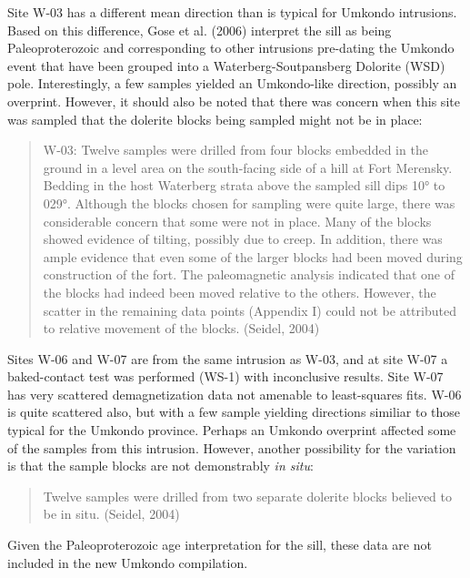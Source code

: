 \documentclass{article}
\begin{document}
    Site W-03 has a different mean direction than is typical for Umkondo
intrusions. Based on this difference, Gose et al. (2006) interpret the
sill as being Paleoproterozoic and corresponding to other intrusions
pre-dating the Umkondo event that have been grouped into a
Waterberg-Soutpansberg Dolorite (WSD) pole. Interestingly, a few samples
yielded an Umkondo-like direction, possibly an overprint. However, it
should also be noted that there was concern when this site was sampled
that the dolerite blocks being sampled might not be in place:

\begin{quote}
W-03: Twelve samples were drilled from four blocks embedded in the
ground in a level area on the south-facing side of a hill at Fort
Merensky. Bedding in the host Waterberg strata above the sampled sill
dips 10° to 029°. Although the blocks chosen for sampling were quite
large, there was considerable concern that some were not in place. Many
of the blocks showed evidence of tilting, possibly due to creep. In
addition, there was ample evidence that even some of the larger blocks
had been moved during construction of the fort. The paleomagnetic
analysis indicated that one of the blocks had indeed been moved relative
to the others. However, the scatter in the remaining data points
(Appendix I) could not be attributed to relative movement of the blocks.
(Seidel, 2004)
\end{quote}

Sites W-06 and W-07 are from the same intrusion as W-03, and at site
W-07 a baked-contact test was performed (WS-1) with inconclusive
results. Site W-07 has very scattered demagnetization data not amenable
to least-squares fits. W-06 is quite scattered also, but with a few
sample yielding directions similiar to those typical for the Umkondo
province. Perhaps an Umkondo overprint affected some of the samples from
this intrusion. However, another possibility for the variation is that
the sample blocks are not demonstrably \emph{in situ}:

\begin{quote}
Twelve samples were drilled from two separate dolerite blocks believed
to be in situ. (Seidel, 2004)
\end{quote}

Given the Paleoproterozoic age interpretation for the sill, these data
are not included in the new Umkondo compilation.
\end{document}
